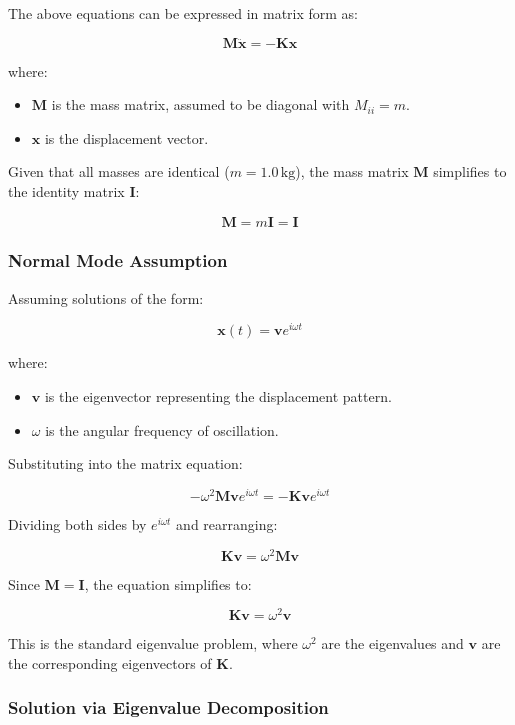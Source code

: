 \documentclass[12pt]{report} %
\begin{document}
The above equations can be expressed in matrix form as:

\[
\mathbf{M} \ddot{\mathbf{x}} = -\mathbf{K} \mathbf{x}
\]

where:
\begin{itemize}
    \item \( \mathbf{M} \) is the mass matrix, assumed to be diagonal with \( M_{ii} = m \).
    \item \( \mathbf{x} \) is the displacement vector.
\end{itemize}

Given that all masses are identical (\( m = 1.0 \, \text{kg} \)), the mass matrix \( \mathbf{M} \) simplifies to the identity matrix \( \mathbf{I} \):

\[
\mathbf{M} = m \mathbf{I} = \mathbf{I}
\]

\subsubsection{Normal Mode Assumption}
\label{subsubsec:part2_task2_normal_mode_assumption}

Assuming solutions of the form:

\[
\mathbf{x}(t) = \mathbf{v} e^{i \omega t}
\]

where:
\begin{itemize}
    \item \( \mathbf{v} \) is the eigenvector representing the displacement pattern.
    \item \( \omega \) is the angular frequency of oscillation.
\end{itemize}

Substituting into the matrix equation:

\[
-\omega^2 \mathbf{M} \mathbf{v} e^{i \omega t} = -\mathbf{K} \mathbf{v} e^{i \omega t}
\]

Dividing both sides by \( e^{i \omega t} \) and rearranging:

\[
\mathbf{K} \mathbf{v} = \omega^2 \mathbf{M} \mathbf{v}
\]

Since \( \mathbf{M} = \mathbf{I} \), the equation simplifies to:

\[
\mathbf{K} \mathbf{v} = \omega^2 \mathbf{v}
\]

This is the standard eigenvalue problem, where \( \omega^2 \) are the eigenvalues and \( \mathbf{v} \) are the corresponding eigenvectors of \( \mathbf{K} \).

\subsubsection{Solution via Eigenvalue Decomposition}
\label{subsubsec:part2_task2_eigen_decomposition}
\end{document}
